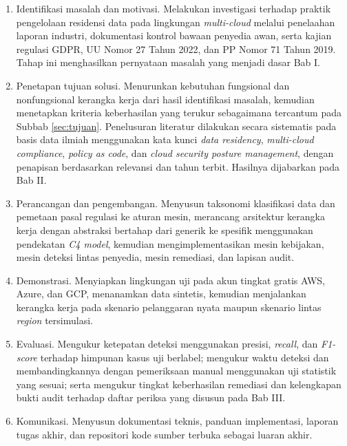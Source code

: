 \begin{enumerate}

\item Identifikasi masalah dan motivasi. Melakukan investigasi terhadap praktik pengelolaan residensi data pada lingkungan \textit{multi-cloud} melalui penelaahan laporan industri, dokumentasi kontrol bawaan penyedia awan, serta kajian regulasi GDPR, UU Nomor 27 Tahun 2022, dan PP Nomor 71 Tahun 2019. Tahap ini menghasilkan pernyataan masalah yang menjadi dasar Bab I.

\item Penetapan tujuan solusi. Menurunkan kebutuhan fungsional dan nonfungsional kerangka kerja dari hasil identifikasi masalah, kemudian menetapkan kriteria keberhasilan yang terukur sebagaimana tercantum pada Subbab \ref{sec:tujuan}. Penelusuran literatur dilakukan secara sistematis pada basis data ilmiah menggunakan kata kunci \textit{data residency}, \textit{multi-cloud compliance}, \textit{policy as code}, dan \textit{cloud security posture management}, dengan penapisan berdasarkan relevansi dan tahun terbit. Hasilnya dijabarkan pada Bab II.

\item Perancangan dan pengembangan. Menyusun taksonomi klasifikasi data dan pemetaan pasal regulasi ke aturan mesin, merancang arsitektur kerangka kerja dengan abstraksi bertahap dari generik ke spesifik menggunakan pendekatan \textit{C4 model}, kemudian mengimplementasikan mesin kebijakan, mesin deteksi lintas penyedia, mesin remediasi, dan lapisan audit.

\item Demonstrasi. Menyiapkan lingkungan uji pada akun tingkat gratis AWS, Azure, dan GCP, menanamkan data sintetis, kemudian menjalankan kerangka kerja pada skenario pelanggaran nyata maupun skenario lintas \textit{region} tersimulasi.

\item Evaluasi. Mengukur ketepatan deteksi menggunakan presisi, \textit{recall}, dan \textit{F1-score} terhadap himpunan kasus uji berlabel; mengukur waktu deteksi dan membandingkannya dengan pemeriksaan manual menggunakan uji statistik yang sesuai; serta mengukur tingkat keberhasilan remediasi dan kelengkapan bukti audit terhadap daftar periksa yang disusun pada Bab III.

\item Komunikasi. Menyusun dokumentasi teknis, panduan implementasi, laporan tugas akhir, dan repositori kode sumber terbuka sebagai luaran akhir.

\end{enumerate}


